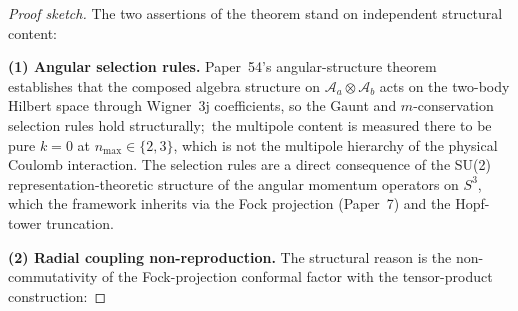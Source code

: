 \documentclass[11pt]{article}
\begin{document}
\begin{proof}[Proof sketch]
The two assertions of the theorem stand on independent structural
content:

\textbf{(1) Angular selection rules.}  Paper~54's angular-structure
theorem~\cite{paper54} establishes that the composed algebra structure on
$\mathcal{A}_a \otimes \mathcal{A}_b$ acts on the two-body Hilbert
space through Wigner~3j coefficients, so the Gaunt and
$m$-conservation selection rules hold structurally;\ the multipole
content is measured there to be pure $k = 0$ at $n_{\max} \in \{2, 3\}$,
which is not the multipole hierarchy of the physical Coulomb interaction.  The selection rules are
a direct consequence of the SU(2) representation-theoretic structure
of the angular momentum operators on $S^3$, which the framework
inherits via the Fock projection (Paper~7) and the Hopf-tower truncation.

\textbf{(2) Radial coupling non-reproduction.} The structural reason
is the non-commutativity of the Fock-projection conformal factor with
the tensor-product construction:


\end{proof}
\end{document}
